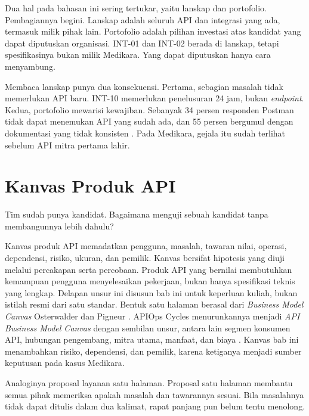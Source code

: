 Dua hal pada bahasan ini sering tertukar, yaitu lanskap dan portofolio. Pembagiannya begini. Lanskap adalah seluruh API dan
integrasi yang ada, termasuk milik pihak lain. Portofolio adalah pilihan investasi atas kandidat yang dapat diputuskan
organisasi. INT-01 dan INT-02 berada di lanskap, tetapi spesifikasinya bukan milik Medikara. Yang dapat diputuskan hanya cara
menyambung.

Membaca lanskap punya dua konsekuensi. Pertama, sebagian masalah tidak memerlukan API baru. INT-10 memerlukan penelusuran
24 jam, bukan \textit{endpoint}. Kedua, portofolio mewarisi kewajiban. Sebanyak 34 persen responden Postman tidak dapat menemukan
API yang sudah ada, dan 55 persen bergumul dengan dokumentasi yang tidak konsisten \cite{postman2025}. Pada Medikara, gejala itu
sudah terlihat sebelum API mitra pertama lahir.

\section{Kanvas Produk API}

Tim sudah punya kandidat. Bagaimana menguji sebuah kandidat tanpa membangunnya lebih dahulu?

Kanvas produk API memadatkan pengguna, masalah, tawaran nilai, operasi, dependensi, risiko, ukuran, dan pemilik. Kanvas bersifat
hipotesis yang diuji melalui percakapan serta percobaan. Produk API yang bernilai membutuhkan kemampuan pengguna menyelesaikan
pekerjaan, bukan hanya spesifikasi teknis yang lengkap. Delapan unsur ini disusun bab ini untuk keperluan kuliah, bukan istilah
resmi dari satu standar. Bentuk satu halaman berasal dari \textit{Business Model Canvas} Osterwalder dan Pigneur
\cite{c08-osterwalder2010}. APIOps Cycles menurunkannya menjadi \textit{API Business Model Canvas} dengan sembilan unsur, antara
lain segmen konsumen API, hubungan pengembang, mitra utama, manfaat, dan biaya \cite{c08-apiops-bmc}. Kanvas bab ini menambahkan
risiko, dependensi, dan pemilik, karena ketiganya menjadi sumber keputusan pada kasus Medikara.

Analoginya proposal layanan satu halaman. Proposal satu halaman membantu semua pihak memeriksa apakah masalah dan tawarannya
sesuai. Bila masalahnya tidak dapat ditulis dalam dua kalimat, rapat panjang pun belum tentu menolong.

